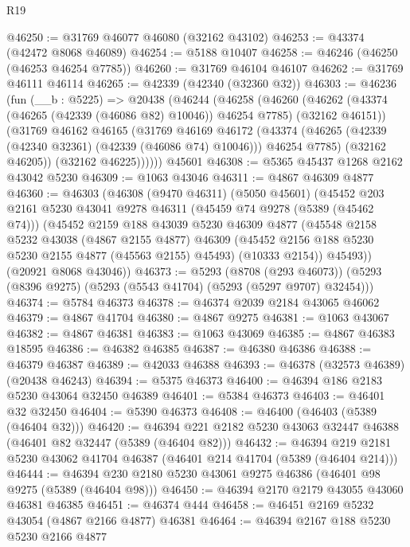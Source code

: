 \begin{lexlean}{R19}
\begin{coremodule}
@46250 := @31769 @46077 @46080 (@32162 @43102)
@46253 := @43374 (@42472 @8068 @46089)
@46254 := @5188 @10407
@46258 := @46246 (@46250 (@46253 @46254 @7785))
@46260 := @31769 @46104 @46107
@46262 := @31769 @46111 @46114
@46265 := @42339 (@42340 (@32360 @32))
@46303 := @46236
    (fun (__b : @5225) =>
    @20438
      (@46244
        (@46258
          (@46260
            (@46262 (@43374 (@46265 (@42339 (@46086 @82) @10046)) @46254 @7785) (@32162 @46151))
            (@31769
              @46162
              @46165
              (@31769
                @46169
                @46172
                (@43374 (@46265 (@42339 (@42340 @32361) (@42339 (@46086 @74) @10046))) @46254 @7785)
                (@32162 @46205))
              (@32162 @46225))))))
    @45601
@46308 := @5365 @45437 @1268 @2162 @43042 @5230
@46309 := @1063 @43046
@46311 := @4867 @46309 @4877
@46360 := @46303
    (@46308
      (@9470 @46311)
      (@5050 @45601)
      (@45452
        @203
        @2161
        @5230
        @43041
        @9278
        @46311
        (@45459 @74 @9278 (@5389 (@45462 @74)))
        (@45452
          @2159
          @188
          @43039
          @5230
          @46309
          @4877
          (@45548
            @2158
            @5232
            @43038
            (@4867 @2155 @4877)
            @46309
            (@45452 @2156 @188 @5230 @5230 @2155 @4877 (@45563 @2155) @45493)
            (@10333 @2154))
          @45493))
      (@20921 @8068 @43046))
@46373 := @5293
    (@8708 (@293 @46073))
    (@5293 (@8396 @9275) (@5293 (@5543 @41704) (@5293 (@5297 @9707) @32454)))
@46374 := @5784 @46373
@46378 := @46374 @2039 @2184 @43065 @46062
@46379 := @4867 @41704
@46380 := @4867 @9275
@46381 := @1063 @43067
@46382 := @4867 @46381
@46383 := @1063 @43069
@46385 := @4867 @46383 @18595
@46386 := @46382 @46385
@46387 := @46380 @46386
@46388 := @46379 @46387
@46389 := @42033 @46388
@46393 := @46378 (@32573 @46389) (@20438 @46243)
@46394 := @5375 @46373
@46400 := @46394 @186 @2183 @5230 @43064 @32450 @46389
@46401 := @5384 @46373
@46403 := @46401 @32 @32450
@46404 := @5390 @46373
@46408 := @46400 (@46403 (@5389 (@46404 @32)))
@46420 := @46394 @221 @2182 @5230 @43063 @32447 @46388 (@46401 @82 @32447 (@5389 (@46404 @82)))
@46432 := @46394 @219 @2181 @5230 @43062 @41704 @46387 (@46401 @214 @41704 (@5389 (@46404 @214)))
@46444 := @46394 @230 @2180 @5230 @43061 @9275 @46386 (@46401 @98 @9275 (@5389 (@46404 @98)))
@46450 := @46394 @2170 @2179 @43055 @43060 @46381 @46385
@46451 := @46374 @444
@46458 := @46451 @2169 @5232 @43054 (@4867 @2166 @4877) @46381
@46464 := @46394 @2167 @188 @5230 @5230 @2166 @4877

\end{coremodule}
\end{lexlean}
